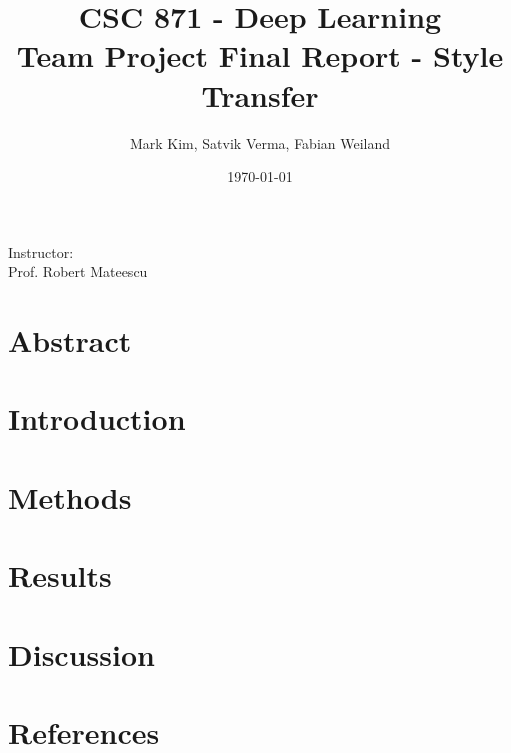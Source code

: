 \documentclass[12pt]{article}
\title{\textbf{CSC 871 - Deep Learning}\\\Large Team Project Final Report - Style Transfer}
\author{\large Mark Kim, Satvik Verma, Fabian Weiland}
\date{\today}
\begin{document}
\maketitle
\vspace{5mm}
\begin{center}
    Instructor:\\
    Prof. Robert Mateescu
\end{center}
\newpage

\section{Abstract}

\section{Introduction}

\section{Methods}

\section{Results}

\section{Discussion}

\section{References}
\end{document}
